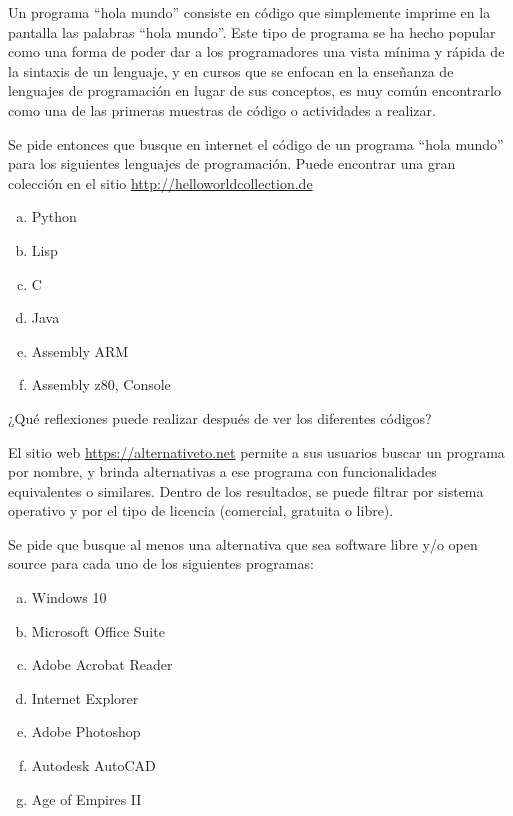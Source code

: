 \begin{exercise}
Un programa ``hola mundo'' consiste en código que simplemente imprime en la
pantalla las palabras ``hola mundo''. Este tipo de programa se ha hecho popular
como una forma de poder dar a los programadores una vista mínima y rápida de la
sintaxis de un lenguaje, y en cursos que se enfocan en la enseñanza de lenguajes
de programación en lugar de sus conceptos, es muy común encontrarlo como una de
las primeras muestras de código o actividades a realizar.

Se pide entonces que busque en internet el código de un programa ``hola mundo''
para los siguientes lenguajes de programación. Puede encontrar una gran
colección en el sitio
\href{http://helloworldcollection.de}{http://helloworldcollection.de}

\begin{enumerate}[a)]
    \item Python
    \item Lisp
    \item C
    \item Java
    \item Assembly ARM
    \item Assembly z80, Console
\end{enumerate}

¿Qué reflexiones puede realizar después de ver los diferentes códigos?
\end{exercise}

\begin{exercise}
El sitio web \href{https://alternativeto.net}{https://alternativeto.net} permite
a sus usuarios buscar un programa por nombre, y brinda alternativas a ese
programa con funcionalidades equivalentes o similares. Dentro de los resultados,
se puede filtrar por sistema operativo y por el tipo de licencia (comercial,
gratuita o libre).

Se pide que busque al menos una alternativa que sea software libre y/o open
source para cada uno de los siguientes programas:
\begin{enumerate}[a)]
    \item Windows 10
    \item Microsoft Office Suite
    \item Adobe Acrobat Reader
    \item Internet Explorer
    \item Adobe Photoshop
    \item Autodesk AutoCAD
    \item Age of Empires II
\end{enumerate}
\end{exercise}
